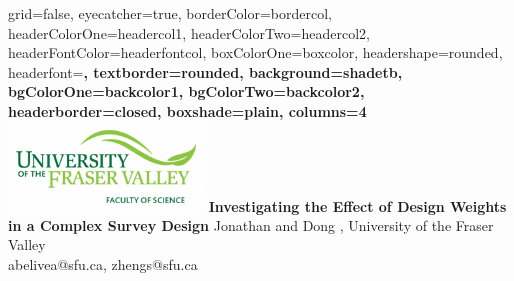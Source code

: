\documentclass[paperwidth=58in,paperheight=47in,portrait]{baposter}
\begin{document}


\begin{poster}{
	grid=false,
	eyecatcher=true, 
	borderColor=bordercol,
	headerColorOne=headercol1,
	headerColorTwo=headercol2,
	headerFontColor=headerfontcol,
	boxColorOne=boxcolor,
	headershape=rounded,
	headerfont=\Large\sf\bf,
	textborder=rounded,
	background=shadetb,
	bgColorOne=backcolor1,
	bgColorTwo=backcolor2,
	headerborder=closed,
  boxshade=plain,
  columns=4
}
{
			\includegraphics[width=14em]{UFV.png}
}
{\sf\bf
	\color{titlecol}Investigating the Effect of Design Weights in a Complex Survey Design
}
{
	\vspace{1em} Jonathan and Dong , University of the Fraser Valley\\
	{\smaller abelivea@sfu.ca, zhengs@sfu.ca}
}
{
}
\end{poster}
\end{document}
